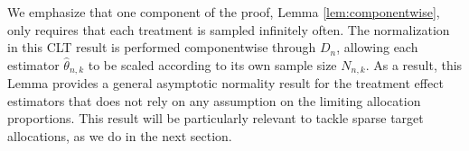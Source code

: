 	\begin{remark}
			We emphasize that one component of the proof, Lemma \ref{lem:componentwise}, only requires that each treatment is sampled
			infinitely often. The normalization in this CLT result is performed componentwise through
			\(D_n\), allowing each estimator \(\hat\theta_{n,k}\) to be scaled according
			to its own sample size \(N_{n,k}\). As a result, this Lemma provides a general asymptotic normality result for the treatment effect estimators that
			does not rely on any assumption on the limiting allocation proportions. This result will be particularly relevant to tackle sparse target allocations, as we do in the next section.
	\end{remark}
	
